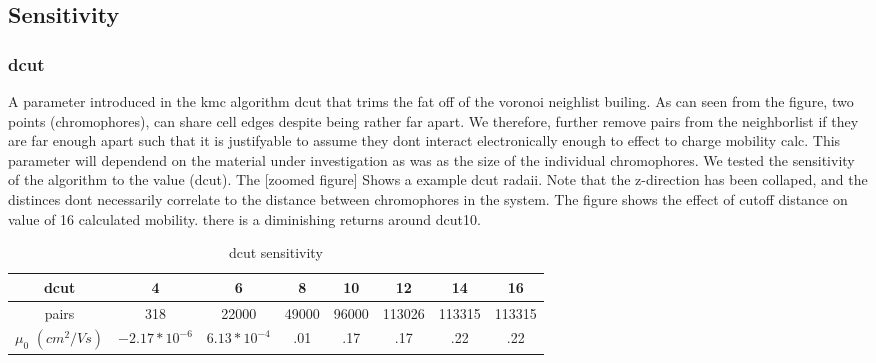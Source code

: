 \subsection{Sensitivity}

\subsubsection{dcut}

A parameter introduced in the kmc algorithm dcut that trims the fat off of the voronoi neighlist builing.
As can seen from the figure, two points (chromophores), can share cell edges despite being rather far apart. We
therefore, further remove pairs from the neighborlist if they are far enough apart such that it is justifyable
to assume they dont interact electronically enough to effect to charge mobility calc. This parameter will
dependend on the material under investigation as was as the size of the individual chromophores. We tested the
sensitivity of the algorithm to the value (dcut). The [zoomed figure] Shows a example dcut radaii. Note that
the z-direction has been collaped, and the distinces dont necessarily correlate to the distance
between chromophores in the system. The figure shows the effect of cutoff distance on value of
16 calculated mobility. there is a diminishing returns around dcut10.


\begin{table}[ht]
\caption{dcut sensitivity}
\centering %
\begin{tabular}{c c c c c c c c} %
\hline\hline %
dcut & 4 & 6 & 8 & 10 & 12 & 14 & 16 \\ [0.5ex] %
\hline  %
pairs & 318 & 22000 & 49000 & 96000 & 113026 & 113315 & 113315 \\ [1ex]%
$\mu_{0}$ $(cm^{2}/Vs)$ & $-2.17*10^{-6}$ & $6.13*10^{-4}$ & .01 & .17 & .17 & .22 & .22 \\ [1ex] %
\hline %
\end{tabular}
\label{table:dcut-sense} %
\end{table}

